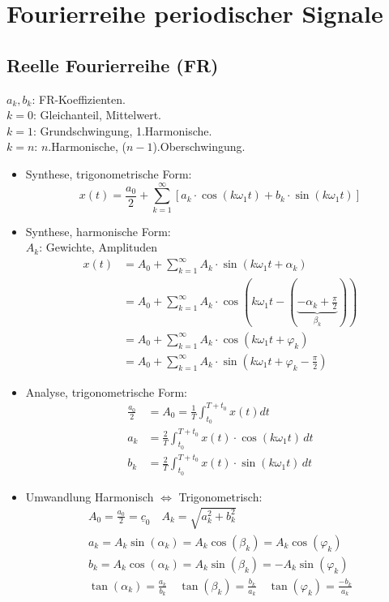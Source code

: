 \newpage
\section{Fourierreihe periodischer Signale}
\subsection{Reelle Fourierreihe (FR)}
		
{\small $a_k, b_k$: FR-Koeffizienten.\\
	$k=0$: Gleichanteil, Mittelwert.\\
	$k=1$: Grundschwingung, 1.Harmonische.\\
	$k=n$: $n$.Harmonische, ($n-1$).Oberschwingung.}
	\begin{itemize}[leftmargin=*]
		\item Synthese, trigonometrische Form:
		      \[
			      x(t) = \frac{a_0}{2} + \sum_{k=1}^\infty [a_k\cdot \cos(k\omega_1 t)+ b_k\cdot \sin(k\omega_1 t)]
		      \]
		\item Synthese, harmonische Form:\\
				{\small $A_k$: Gewichte, Amplituden}
		      \begin{align*}
			      x(t) & = A_0+\sum_{k=1}^\infty A_k\cdot \sin (k\omega_1 t + \alpha_k)              \\
			           & = A_0+\sum_{k=1}^\infty A_k\cdot \cos (k\omega_1 t -( \underbrace{-\alpha_k+\frac{\pi}{2} }_{\beta_k}))\\
			           & = \boxed{A_0+\sum_{k=1}^\infty A_k\cdot \cos (k\omega_1 t + \varphi_k)}\\
  			           & = A_0+\sum_{k=1}^\infty A_k \cdot \sin (k\omega_1 t + \varphi_k - \frac{\pi}{2})
		      \end{align*}

		\item Analyse, trigonometrische Form:
		\begin{align*}
		      	\frac{a_0}{2}&= A_0 = \frac{1}{T}\int_{t_0}^{T+t_0} x(t)dt\\
			      a_k &= \frac{2}{T}\int_{t_0}^{T+t_0} x(t)\cdot \cos(k\omega_1 t)\,dt \\
			      b_k &= \frac{2}{T}\int_{t_0}^{T+t_0} x(t)\cdot \sin(k\omega_1 t)\,dt
		\end{align*}
		\item Umwandlung Harmonisch $\Leftrightarrow$ Trigonometrisch:
		\begin{gather*}
			A_0 = \frac{a_0}{2} = \underline{c}_0 \quad
			A_k = \sqrt{a_k^2+b_k^2}\\
			a_k = A_k \sin(\alpha_k) = A_k \cos(\beta_k) = A_k \cos(\varphi_k)\\
			b_k = A_k \cos(\alpha_k) = A_k \sin(\beta_k) = - A_k \sin(\varphi_k)\\
			\tan(\alpha_k)=\frac{a_k}{b_k} \quad \tan(\beta_k)=\frac{b_k}{a_k} \quad \tan(\varphi_k)=\frac{-b_k}{a_k}
		\end{gather*}
	\end{itemize}

